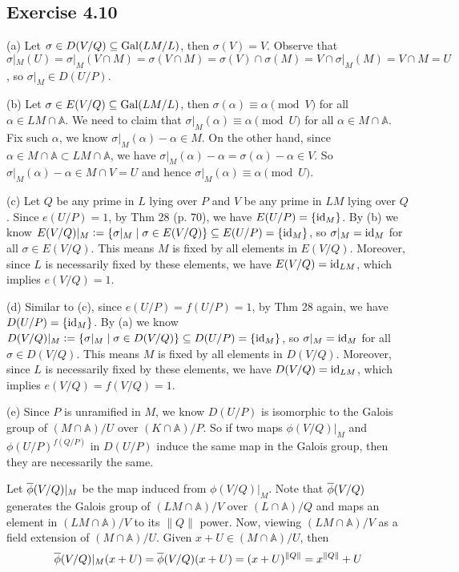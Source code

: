 \documentclass[../Marcus.tex]{subfiles}
\begin{document}
\subsection*{Exercise 4.10}

(a) Let $\sigma\in D(V/Q)\subseteq\operatorname{Gal}(LM/L)$, then $\sigma(V)=V$. Observe that $\sigma|_M(U)=\sigma|_M(V\cap M)=\sigma(V\cap M)=\sigma(V)\cap\sigma(M)=V\cap\sigma|_M(M)=V\cap M=U$, so $\sigma|_M\in D(U/P)$.

(b) Let $\sigma\in E(V/Q)\subseteq\operatorname{Gal}(LM/L)$, then $\sigma(\alpha)\equiv\alpha \pmod{V}$ for all $\alpha\in LM\cap\mathbb{A}$. We need to claim that $\sigma|_M(\alpha)\equiv\alpha\pmod{U}$ for all $\alpha\in M\cap\mathbb{A}$. Fix such $\alpha$, we know $\sigma|_M(\alpha)-\alpha\in M$. On the other hand, since $\alpha\in M\cap\mathbb{A}\subset LM\cap\mathbb{A}$, we have $\sigma|_M(\alpha)-\alpha=\sigma(\alpha)-\alpha\in V$. So $\sigma|_M(\alpha)-\alpha\in M\cap V=U$ and hence $\sigma|_M(\alpha)\equiv\alpha\pmod{U}$.

(c) Let $Q$ be any prime in $L$ lying over $P$ and $V$ be any prime in $LM$ lying over $Q$. Since $e(U/P)=1$, by Thm 28 (p. 70), we have $E(U/P)=\{\operatorname{id}_M\}$. By (b) we know $E(V/Q)|_M:=\{\sigma|_M \mid \sigma\in E(V/Q)\} \subseteq E(U/P)=\{\operatorname{id}_M\}$, so $\sigma|_M=\operatorname{id}_M$ for all $\sigma\in E(V/Q)$. This means $M$ is fixed by all elements in $E(V/Q)$. Moreover, since $L$ is necessarily fixed by these elements, we have $E(V/Q)=\operatorname{id}_{LM}$, which implies $e(V/Q)=1$.

(d) Similar to (c), since $e(U/P)=f(U/P)=1$, by Thm 28 again, we have $D(U/P)=\{\operatorname{id}_M\}$. By (a) we know $D(V/Q)|_M:=\{\sigma|_M \mid \sigma\in D(V/Q)\} \subseteq D(U/P)=\{\operatorname{id}_M\}$, so $\sigma|_M=\operatorname{id}_M$ for all $\sigma\in D(V/Q)$. This means $M$ is fixed by all elements in $D(V/Q)$. Moreover, since $L$ is necessarily fixed by these elements, we have $D(V/Q)=\operatorname{id}_{LM}$, which implies $e(V/Q)=f(V/Q)=1$.

(e) Since $P$ is unramified in $M$, we know $D(U/P)$ is isomorphic to the Galois group of $(M\cap\mathbb{A})/U$ over $(K\cap\mathbb{A})/P$. So if two maps $\phi(V/Q)|_M$ and $\phi(U/P)^{f(Q/P)}$ in $D(U/P)$ induce the same map in the Galois group, then they are necessarily the same. 

Let $\overline{\phi}(V/Q)|_M$ be the map induced from $\phi(V/Q)|_M$. Note that $\overline{\phi}(V/Q)$ generates the Galois group of $(LM\cap\mathbb{A})/V$ over $(L\cap\mathbb{A})/Q$ and maps an element in $(LM\cap\mathbb{A})/V$ to its $\|Q\|$ power. Now, viewing $(LM\cap\mathbb{A})/V$ as a field extension of $(M\cap\mathbb{A})/U$. Given $x+U\in(M\cap\mathbb{A})/U$, then $$\overline{\phi}(V/Q)|_M(x+U)=\overline{\phi}(V/Q)(x+U)=(x+U)^{\|Q\|}=x^{\|Q\|}+U$$
\end{document}
